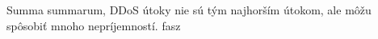 \documentclass[11pt,a4paper]{article}
\begin{document}
Summa summarum, DDoS útoky nie sú tým najhorším útokom, ale môžu spôsobiť mnoho nepríjemností. fasz




\newpage


\makeatletter
\makeatother


\begin{flushleft}

\end{flushleft}
\end{document}
